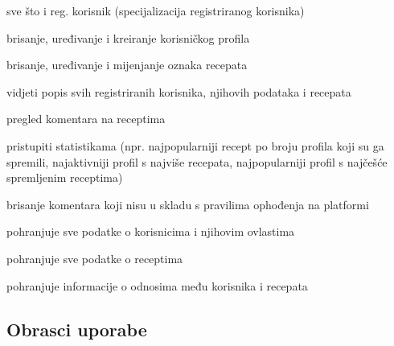 \begin{packed_enum}
\begin{packed_enum}
				\end{packed_enum}

				\item  {}
				\begin{packed_enum}

					\item sve što i reg. korisnik (specijalizacija registriranog korisnika)
					\item brisanje, uređivanje i kreiranje korisničkog profila
					\item brisanje, uređivanje i mijenjanje oznaka recepata
					\item vidjeti popis svih registriranih korisnika, njihovih podataka i recepata
					\item pregled komentara na receptima
					\item pristupiti statistikama (npr. najpopularniji recept po broju profila koji su ga spremili, najaktivniji profil s najviše recepata, najpopularniji profil s najčešće spremljenim receptima)
					\item brisanje komentara koji nisu u skladu s pravilima ophođenja na platformi

				\end{packed_enum}
			
				\item  {}
				
				\begin{packed_enum}
					
					\item pohranjuje sve podatke o korisnicima i njihovim ovlastima
					\item pohranjuje sve podatke o receptima
					\item pohranjuje informacije o odnosima među korisnika i recepata
					
				\end{packed_enum}
			\end{packed_enum}
			
			\eject 
			
			
				
			\subsection{Obrasci uporabe}
					
